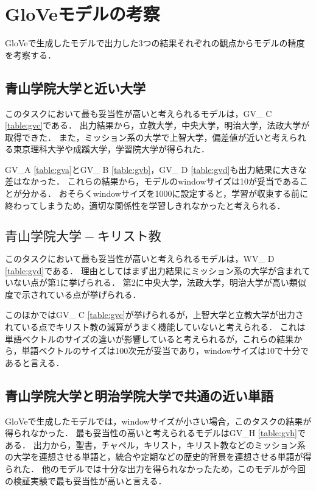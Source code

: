 \section{GloVeモデルの考察}
GloVeで生成したモデルで出力した3つの結果それぞれの観点からモデルの精度を考察する．

\subsection{青山学院大学と近い大学}
このタスクにおいて最も妥当性が高いと考えられるモデルは，GV\_ C \ref{table:gvc}である．
出力結果から，立教大学，中央大学，明治大学，法政大学が取得できた．
また，ミッション系の大学で上智大学，偏差値が近いと考えられる東京理科大学や成蹊大学，学習院大学が得られた．

GV\_A \ref{table:gva}とGV\_ B \ref{table:gvb}，GV\_ D \ref{table:gvd}も出力結果に大きな差はなかった．
これらの結果から，モデルのwindowサイズは10が妥当であることが分かる．
おそらくwindowサイズを1000に設定すると，学習が収束する前に終わってしまうため，適切な関係性を学習しきれなかったと考えられる．

\subsection{$ 青山学院大学 - キリスト教 $}
このタスクにおいて最も妥当性が高いと考えられるモデルは，WV\_ D \ref{table:gvd}である．
理由としてはまず出力結果にミッション系の大学が含まれていない点が第1に挙げられる．
第2に中央大学，法政大学，明治大学が高い類似度で示されている点が挙げられる．

このほかではGV\_ C \ref{table:gvc}が挙げられるが，上智大学と立教大学が出力されている点でキリスト教の減算がうまく機能していないと考えられる．
これは単語ベクトルのサイズの違いが影響していると考えられるが，これらの結果から，単語ベクトルのサイズは100次元が妥当であり，windowサイズは10で十分であると言える．

\subsection{青山学院大学と明治学院大学で共通の近い単語}
GloVeで生成したモデルでは，windowサイズが小さい場合，このタスクの結果が得られなかった．
最も妥当性の高いと考えられるモデルはGV\_H \ref{table:gvh}である．
出力から，聖書，チャペル，キリスト，キリスト教などのミッション系の大学を連想させる単語と，統合や定期などの歴史的背景を連想させる単語が得られた．
他のモデルでは十分な出力を得られなかったため，このモデルが今回の検証実験で最も妥当性が高いと言える．

